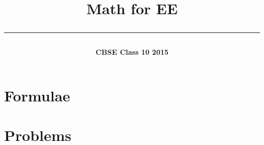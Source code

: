 \documentclass[journal]{IEEEtran}
\begin{document}

\onecolumn

\title{
  \begin{center}
  {\LARGE\bfseries Math for EE}\\
  \rule{0.4\columnwidth}{0.4pt}
  \end{center}
}
\author{
  \vspace{11cm}
  \begin{center}
  {\fontsize{26}{31}\selectfont\bfseries CBSE Class 10 2015}
  \end{center}
}
\maketitle
\thispagestyle{empty}
\newpage
\tableofcontents
\newpage

\section{Formulae}

\newpage
\section{Problems}

\end{document}
